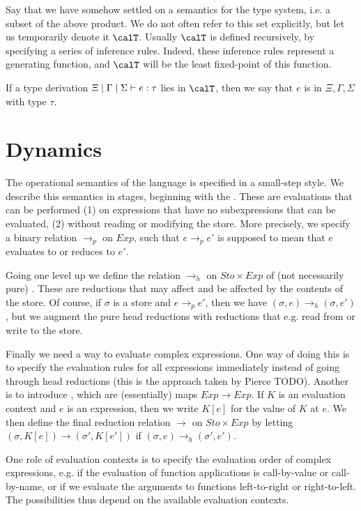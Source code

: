 \documentclass[a4paper, 11pt, article, danish, oneside]{memoir}
\newcommand{\step}{\to}
\newcommand{\headstep}{\to_h}
\newcommand{\purestep}{\to_p}
\renewcommand{\prod}{\times}
\newcommand{\setSto}{\mathit{Sto}}
\newcommand{\setExp}{\mathit{Exp}}
\begin{document}
Say that we have somehow settled on a semantics for the type system, i.e. a subset of the above product. We do not often refer to this set explicitly, but let us temporarily denote it $\calT$. Usually $\calT$ is defined recursively, by specifying a series of inference rules. Indeed, these inference rules represent a generating function, and $\calT$ will be the least fixed-point of this function.

If a type derivation $\hastype{\Xi}{\Gamma}{\Sigma}{e}{\tau}$ lies in $\calT$, then we say that $e$ is  in $\Xi,\Gamma,\Sigma$ with type $\tau$.


\section{Dynamics}

The operational semantics of the language is specified in a small-step style. We describe this semantics in stages, beginning with the . These are evaluations that can be performed (1) on expressions that have no subexpressions that can be evaluated, (2) without reading or modifying the store. More precisely, we specify a binary relation $\purestep$ on $\setExp$, such that $e \purestep e'$ is supposed to mean that $e$ evaluates to or reduces to $e'$.

Going one level up we define the relation $\headstep$ on $\setSto \prod \setExp$ of (not necessarily pure) . These are reductions that may affect and be affected by the contents of the store. Of course, if $\sigma$ is a store and $e \purestep e'$, then we have $(\sigma,e) \headstep (\sigma,e')$, but we augment the pure head reductions with reductions that e.g. read from or write to the store.

Finally we need a way to evaluate complex expressions. One way of doing this is to specify the evaluation rules for all expressions immediately instead of going through head reductions (this is the approach taken by Pierce TODO). Another is to introduce , which are (essentially) maps $\setExp \to \setExp$. If $K$ is an evaluation context and $e$ is an expression, then we write $K[e]$ for the value of $K$ at $e$. We then define the final reduction relation $\step$ on $\setSto \prod \setExp$ by letting $(\sigma, K[e]) \step (\sigma', K[e'])$ if $(\sigma,e) \headstep (\sigma',e')$.

One role of evaluation contexts is to specify the evaluation order of complex expressions, e.g. if the evaluation of function applications is call-by-value or call-by-name, or if we evaluate the arguments to functions left-to-right or right-to-left. The possibilities thus depend on the available evaluation contexts.
\end{document}
